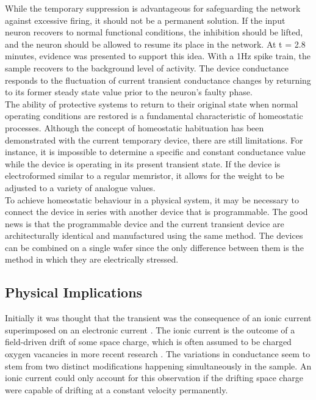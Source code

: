 \noindent  While the temporary suppression is advantageous for safeguarding the network against excessive firing, it should not be a permanent solution. If the input neuron recovers to normal functional conditions, the inhibition should be lifted, and the neuron should be allowed to resume its place in the network. At t = 2.8 minutes, evidence was presented to support this idea. With a 1Hz spike train, the sample recovers to the background level of activity. The device conductance responds to the fluctuation of current transient conductance changes by returning to its former steady state value prior to the neuron's faulty phase. \\

\noindent The ability of protective systems to return to their original state when normal operating conditions are restored is a fundamental characteristic of homeostatic processes. Although the concept of homeostatic habituation has been demonstrated with the current temporary device, there are still limitations. For instance, it is impossible to determine a specific and constant conductance value while the device is operating in its present transient state. If the device is electroformed similar to a regular memristor, it allows for the weight to be adjusted to a variety of analogue values.\\

\noindent To achieve homeostatic behaviour in a physical system, it may be necessary to connect the device in series with another device that is programmable. The good news is that the programmable device and the current transient device are architecturally identical and manufactured using the same method. The devices can be combined on a single wafer since the only difference between them is the method in which they are electrically stressed.

\subsection[Physical Implications]{Physical Implications}


Initially it was thought that the transient was the consequence of an ionic current superimposed on an electronic current \cite{many1962theory, lampert1970current}. The ionic current is the outcome of a field-driven drift of some space charge, which is often assumed to be charged oxygen vacancies in more recent research \cite{saha2001transient}. The variations in conductance seem to stem from two distinct modifications happening simultaneously in the sample. An ionic current could only account for this observation if the drifting space charge were capable of drifting at a constant velocity permanently. \\

